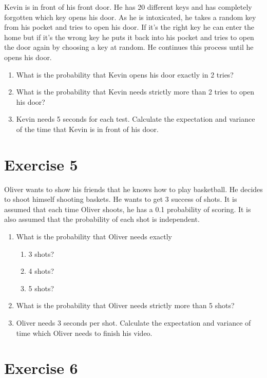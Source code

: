 \documentclass[12pt,thmsa]{article}\usepackage[]{graphicx}\usepackage[]{color}
\begin{document}
Kevin is in front of his front door. He has 20 different keys and has completely forgotten which key opens his door. As he is intoxicated, he takes a random key from his pocket and tries to open his door. If it's the right key he can enter the home but if it's the wrong key he puts it back into his pocket and tries to open the door again by choosing a key at random. He continues this process until he opens his door.

\begin{enumerate}
\item What is the probability that Kevin opens his door exactly in 2 tries?
\item What is the probability that Kevin needs strictly more than 2 tries to open his door?
\item Kevin needs 5 seconds for each test. Calculate the expectation and variance of the time that Kevin is in front of his door.
\end{enumerate}




\section*{Exercise 5}

Oliver wants to show his friends that he knows how to play basketball. He decides to shoot himself shooting baskets. He wants to get 3 success of shots. It is assumed that each time Oliver shoots, he has a 0.1 probability of scoring. It is also assumed that the probability of each shot is independent.

\begin{enumerate}
\item What is the probability that Oliver needs exactly
\begin{enumerate}
\item 3 shots?
\item 4 shots?
\item 5 shots?
\end{enumerate}
\item What is the probability that Oliver needs strictly more than 5 shots?
\item Oliver needs 3 seconds per shot. Calculate the expectation and variance of time
which Oliver needs to finish his video.
\end{enumerate}


\section*{Exercise 6}
\end{document}
